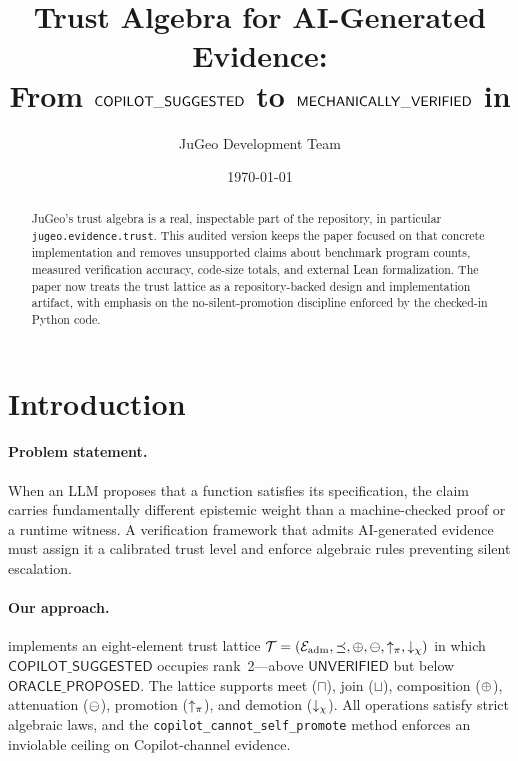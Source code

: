 \documentclass[11pt]{article}
\title{Trust Algebra for AI-Generated Evidence:\\
From $\CopSugg$ to $\mathsf{MECHANICALLY\_VERIFIED}$ in \JuGeo}
\author{JuGeo Development Team}
\date{\today}
\newcommand{\TAlg}{\mathcal{T}}
\newcommand{\CopSugg}{\mathsf{COPILOT\_SUGGESTED}}
\newcommand{\OracProp}{\mathsf{ORACLE\_PROPOSED}}
\newcommand{\Unver}{\mathsf{UNVERIFIED}}
\begin{document}
\maketitle

\begin{abstract}
JuGeo's trust algebra is a real, inspectable part of the repository, in
particular \texttt{jugeo.evidence.trust}.  This audited version keeps the
paper focused on that concrete implementation and removes unsupported
claims about benchmark program counts, measured verification accuracy,
code-size totals, and external Lean formalization.  The paper now treats
the trust lattice as a repository-backed design and implementation
artifact, with emphasis on the no-silent-promotion discipline enforced
by the checked-in Python code.
\end{abstract}

\section{Introduction}\label{sec:intro}

\paragraph{Problem statement.}
When an LLM proposes that a function satisfies its specification, the claim
carries fundamentally different epistemic weight than a machine-checked proof
or a runtime witness.  A verification framework that admits AI-generated
evidence must assign it a calibrated trust level and enforce algebraic rules
preventing silent escalation.

\paragraph{Our approach.}
\JuGeo{} implements an eight-element trust lattice
$\TAlg = (\Eadm, \tleq, \tjoin, \tatten, \tpromote, \tdemote)$ in which
$\CopSugg$ occupies rank~2---above $\Unver$ but below $\OracProp$.
The lattice supports meet ($\sqcap$), join ($\sqcup$), composition ($\oplus$),
attenuation ($\ominus$), promotion ($\uparrow_\pi$), and demotion ($\downarrow_\chi$).
All operations satisfy strict algebraic laws, and the
\texttt{copilot\_cannot\_self\_promote} method enforces an inviolable ceiling
on Copilot-channel evidence.
\end{document}
